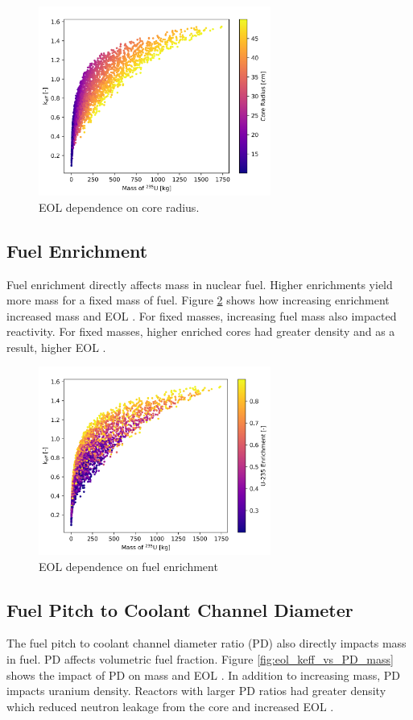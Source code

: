 \begin{figure}[h]
    \centering
    \includegraphics[width=3in]{../images/keff_vs_mass_235_core_r.png}
\caption{EOL \keff dependence on core radius.}
\label{fig:eol_keff_vs_r_core}
\end{figure}

\subsection{Fuel Enrichment}
Fuel enrichment directly affects \uran mass in nuclear fuel. Higher enrichments
yield more \uran mass for a fixed mass of fuel. Figure
\ref{fig:eol_keff_vs_mass_enrich} shows how increasing enrichment increased \uran
mass and EOL \keff. For fixed \uran masses, increasing fuel mass also impacted
reactivity. For fixed \uran masses, higher enriched cores had greater \uran
density and as a result, higher EOL \keff.

\begin{figure}[h]
    \centering
    \includegraphics[width=3in]{../images/keff_vs_mass_235_enrich.png}
\caption{EOL \keff dependence on fuel enrichment}
\label{fig:eol_keff_vs_mass_enrich}
\end{figure}

\subsection{Fuel Pitch to Coolant Channel Diameter}
The fuel pitch to coolant channel diameter ratio (PD) also directly impacts
\uran mass in fuel. PD affects volumetric fuel fraction. Figure
\ref{fig:eol_keff_vs_PD_mass} shows the impact of PD on \uran mass and EOL
\keff. In addition to increasing \uran mass, PD impacts uranium density.
Reactors with larger PD ratios had greater \uran density which reduced neutron
leakage from the core and increased EOL \keff.

